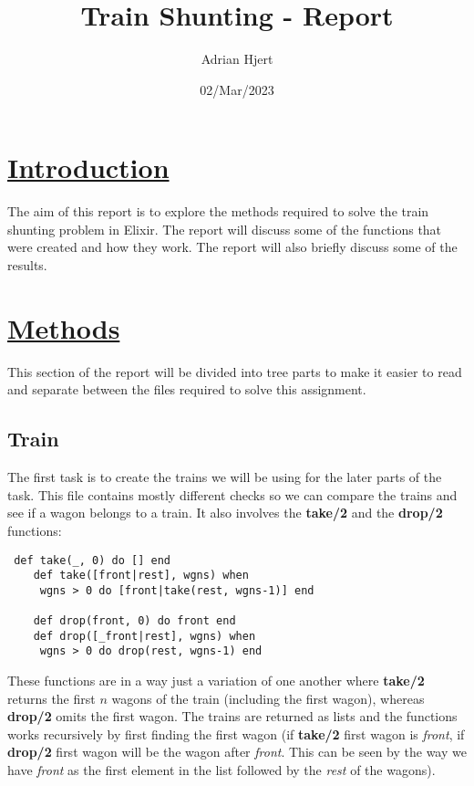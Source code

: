 \documentclass[a4paper,11pt]{article}
\begin{document}
\title{
	\textbf{Train Shunting - Report}
}
\date{02/Mar/2023}
\author{Adrian Hjert}

\maketitle

\section*{
	\underline{Introduction}
	}
The aim of this report is to explore the methods required to solve the train shunting problem in Elixir. The report will discuss some of the functions that were created and how they work. The report will also briefly discuss some of the results. 
	
	
	

\section*{
	\underline{Methods}
	}
This section of the report will be divided into tree parts to make it easier to read and separate between the files required to solve this assignment.
\subsection*{
	\textbf{Train}
	}
The first task is to create the trains we will be using for the later parts of the task. This file contains mostly different checks so we can compare the trains and see if a wagon belongs to a train. It also involves the \textbf{take/2} and the \textbf{drop/2} functions:

\begin{verbatim}
 def take(_, 0) do [] end
    def take([front|rest], wgns) when
     wgns > 0 do [front|take(rest, wgns-1)] end

    def drop(front, 0) do front end
    def drop([_front|rest], wgns) when
     wgns > 0 do drop(rest, wgns-1) end
\end{verbatim}
 These functions are in a way just a variation of one another where \textbf{take/2} returns the first $n$ wagons of the train (including the first wagon), whereas \textbf{drop/2} omits the first wagon. The trains are returned as lists and the functions works recursively by first finding the first wagon (if \textbf{take/2} first wagon is \textit{front}, if \textbf{drop/2} first wagon will be the wagon after \textit{front}. This can be seen by the way we have \textit{front} as the first element in the list followed by the \textit{rest} of the wagons).
 
\end{document}

